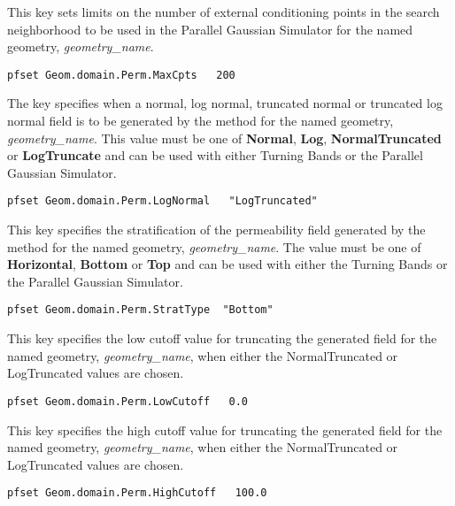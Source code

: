 {
This key sets limits on the number of external conditioning points in the
search neighborhood to be used in the Parallel Gaussian Simulator for
the named geometry, {\em geometry\_name}.
}
\begin{display}\begin{verbatim}
pfset Geom.domain.Perm.MaxCpts   200
\end{verbatim}\end{display}

{
The key specifies when a normal, log normal, truncated normal or
truncated log normal field is to be generated by the method for the
named geometry, {\em geometry\_name}.  This value must be one of
{\bf Normal}, {\bf Log}, {\bf NormalTruncated} or {\bf LogTruncate}
and can be used with either Turning Bands or the Parallel Gaussian
Simulator.
}
\begin{display}\begin{verbatim}
pfset Geom.domain.Perm.LogNormal   "LogTruncated"
\end{verbatim}\end{display}

{
This key specifies the stratification of the permeability field
generated by the method for the named geometry, {\em geometry\_name}.
The value must be one of {\bf Horizontal}, {\bf Bottom} or {\bf Top} and
can be used with either the Turning Bands or the Parallel Gaussian
Simulator.
}
\begin{display}\begin{verbatim}
pfset Geom.domain.Perm.StratType  "Bottom"
\end{verbatim}\end{display}

{
This key specifies the low cutoff value for truncating the generated
field for the named geometry, {\em geometry\_name}, when either the
NormalTruncated or LogTruncated values are chosen.
}
\begin{display}\begin{verbatim}
pfset Geom.domain.Perm.LowCutoff   0.0
\end{verbatim}\end{display}

{
This key specifies the high cutoff value for truncating the generated
field for the named geometry, {\em geometry\_name}, when either the
NormalTruncated or LogTruncated values are chosen.
}
\begin{display}\begin{verbatim}
pfset Geom.domain.Perm.HighCutoff   100.0
\end{verbatim}\end{display}

